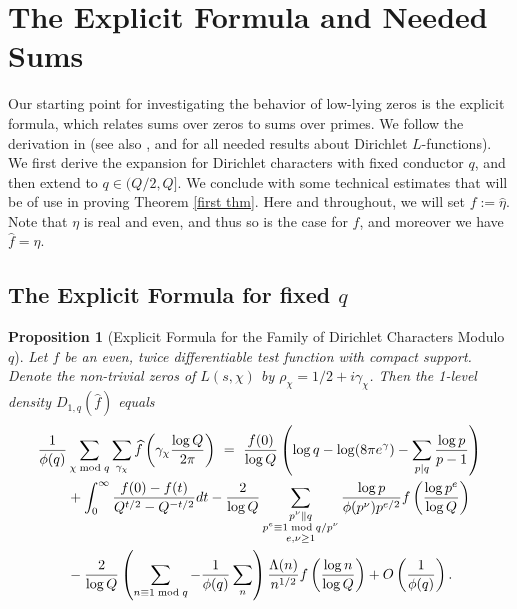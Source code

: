 \documentclass[12pt,reqno]{amsart}
\numberwithin{equation}{section}
\theoremstyle{plain}
\newtheorem{proposition}[thm]{Proposition}
\begin{document}
\section{The Explicit Formula and Needed Sums}\label{sec:expformulaestimates}

Our starting point for investigating the behavior of low-lying zeros is the explicit formula, which relates sums over zeros to sums over primes. We follow the derivation in \cite{montgomery} (see also \cite{ILS,RS}, and \cite{Da,IK} for all needed results about Dirichlet $L$-functions). We first derive the expansion for Dirichlet characters with fixed conductor $q$, and then extend to $q \in (Q/2, Q]$. We conclude with some technical estimates that will be of use in proving Theorem \ref{first thm}. Here and throughout, we will set $f:={\widehat{\eta}}$. Note that $\eta$ is real and even, and thus so is the case for $f$, and moreover we have $\widehat f = \eta$.

\subsection{The Explicit Formula for fixed $q$}

\begin{proposition}[Explicit Formula for the Family of Dirichlet Characters Modulo $q$]
\label{proposition explicit formula}
Let $f$ be an even, twice differentiable test function with compact support. Denote the non-trivial zeros of $L(s,\chi)$ by $\rho_\chi=1/2+i\gamma_\chi$. Then the 1-level density $D_{1,q}(\widehat{f})$ equals
\begin{align}
\frac 1{\phi(q)}&\sum_{\chi \bmod q} \sum_{\gamma_{\chi}} \widehat{f}\left(
\gamma_{\chi} \frac{\log Q}{2\pi} \right)\ =\  \frac{f(0)}{\log Q} \left(  \log q -\log(8\pi e^{\gamma})-\sum_{p\mid q}\frac{\log p}{p-1}\right)\notag \\
&+\int_0^{\infty}\frac{f(0)-f(t)}{Q^{t/2}-Q^{-t/2}} dt -\frac 2{\log Q} \sum_{\substack{p^{\nu}\parallel q \\ p^e \equiv 1 \bmod q/p^{\nu} \\ e, \nu \geq 1}}\frac{\log p}{\phi(p^{\nu})p^{e/2}}f\left( \frac{\log p^{e}}{\log Q}\right)\notag
\\ &-\frac{2}{\log Q} \left(\sum_{n\equiv 1 \bmod q}-\frac 1{\phi(q)}\sum_{n} \right)\frac{\Lambda(n)}{n^{1/2}} f\left(
\frac{\log n}{\log Q}\right)+O\left(\frac{1}{\phi(q)}\right).
\label{explicit formula}
\end{align}
\end{proposition}
\end{document}
